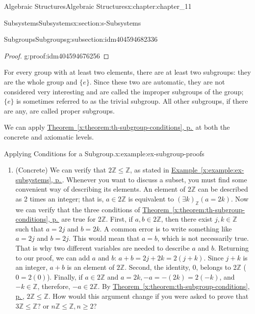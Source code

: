 \documentclass[twoside,10pt,]{book}
\newcommand{\xreffont}{\relax}
\numberwithin{equation}{section}
\begin{document}
\begin{chapterptx}{Algebraic Structures}{}{Algebraic Structures}{}{}{x:chapter:chapter_11}
\begin{sectionptx}{Subsystems}{}{Subsystems}{}{}{x:section:s-Subsystems}
\begin{subsectionptx}{Subgroups}{}{Subgroups}{}{}{g:subsection:idm404594682336}
\begin{proof}{}{g:proof:idm404594676256}
\end{proof}
For every group with at least two elements, there are at least two subgroups: they are the whole group and \(\{e\}\). Since these two are automatic, they are not considered very interesting and are called the improper subgroups of the group; \(\{e\}\) is sometimes referred to as the trivial subgroup. All other subgroups, if there are any, are called proper subgroups.%
\par
We can apply \hyperref[x:theorem:th-subgroup-conditions]{Theorem~{\xreffont\ref{x:theorem:th-subgroup-conditions}}, p.\,\pageref{x:theorem:th-subgroup-conditions}} at both the concrete and axiomatic levels.%
\begin{example}{Applying Conditions for a Subgroup.}{x:example:ex-subgroup-proofs}%
%
\begin{enumerate}[label=(\alph*)]
\item{}(Concrete) We can verify that \(2\mathbb{Z} \leq  \mathbb{Z}\), as stated in \hyperref[x:example:ex-subsystems]{Example~{\xreffont\ref{x:example:ex-subsystems}}, p.\,\pageref{x:example:ex-subsystems}}. Whenever you want to discuss a subset, you must find some convenient way of describing its elements. An element of \(2\mathbb{Z}\) can be described as 2 times an integer; that is, \(a \in  2\mathbb{Z}\) is equivalent to \((\exists k)_{\mathbb{Z}}(a = 2k)\). Now we can verify that the three conditions of \hyperref[x:theorem:th-subgroup-conditions]{Theorem~{\xreffont\ref{x:theorem:th-subgroup-conditions}}, p.\,\pageref{x:theorem:th-subgroup-conditions}} are true for 2\(\mathbb{Z}\). First, if \(a, b \in  2\mathbb{Z}\), then there exist \(j, k \in  \mathbb{Z}\) such that \(a = 2j\) and \(b = 2k\).   A common error is to write something like  \(a=2j\)  and \(b=2j\).  This would mean that \(a=b\), which is not necessarily true.   That is why two different variables are needed to describe \(a\) and \(b\).  Returning to our proof, we can add \(a\) and \(b\): \(a + b = 2j + 2k = 2(j + k)\). Since \(j + k\) is an integer, \(a + b\) is an element of \(2\mathbb{Z}\).   Second, the identity, \(0\), belongs to 2\(\mathbb{Z}\) (\(0 = 2(0)\)).  Finally, if \(a \in  2\mathbb{Z}\) and \(a = 2k, -a = -(2k) = 2(-k)\), and  \(-k\in \mathbb{Z}\),  therefore, \(-a \in  2\mathbb{Z}\). By \hyperref[x:theorem:th-subgroup-conditions]{Theorem~{\xreffont\ref{x:theorem:th-subgroup-conditions}}, p.\,\pageref{x:theorem:th-subgroup-conditions}}, \(2\mathbb{Z} \leq  \mathbb{Z}\). How would this argument change if you were asked to prove that \(3\mathbb{Z} \leq  \mathbb{Z}\)? or \(n \mathbb{Z} \leq  \mathbb{Z}, n \geq  2\)?%

\end{enumerate}
\end{example}
\end{subsectionptx}
\end{sectionptx}
\end{chapterptx}
\end{document}
